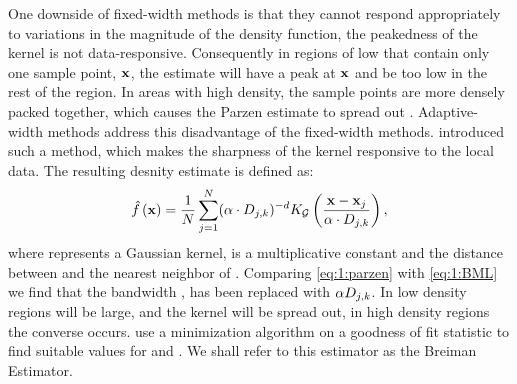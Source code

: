 	One downside of fixed-width methods is that they cannot respond appropriately to variations in the magnitude of the density function, \ie the peakedness of the kernel is not data-responsive. Consequently in regions of low \varDensityFunction{\varPattern} that contain only one sample point, $\varPattern$, the estimate will have a peak at $\varPattern$ and be too low in the rest of the region. In areas with high density, the sample points are more densely packed together, which causes the Parzen estimate to spread out \cite{breiman1977variable}. Adaptive-width methods address this disadvantage of the fixed-width methods. \citeauthor{breiman1977variable} introduced such a method, which makes the sharpness of the kernel responsive to the local data. The resulting desnity estimate is defined as:
	\begin{equation}\label{eq:1:BML}
	 	\varEstimatedDensityFunction{\varPattern} = \frac{1}{\varNumPatterns} \sum_{j = 1}^{\varNumPatterns} (\varBMLconstant \cdot \varKNNDistance{j}{k})^{-\varDim} \varKernel[\varGaussian]{\frac{\varPattern - \varPattern[j]}{\varBMLconstant \cdot \varKNNDistance{j}{k}}},
	\end{equation} 
	where \varKernel[\varGaussian]{\cdot} represents a Gaussian kernel, \varBMLconstant is a multiplicative constant and  the distance between \varPattern[j] and the \KNNK nearest neighbor of \varPattern[j]. Comparing \cref{eq:1:parzen} with \eqref{eq:1:BML} we find that the bandwidth \varBandwidth, has been replaced with $\alpha D_{j, k}$.  In low density regions  will be large, and the kernel will be spread out, in high density regions the converse occurs. \citeauthor{breiman1977variable} use a minimization algorithm on a goodness of fit statistic to find suitable values for \KNNK and \varBMLconstant. We shall refer to this estimator as the Breiman Estimator. 

